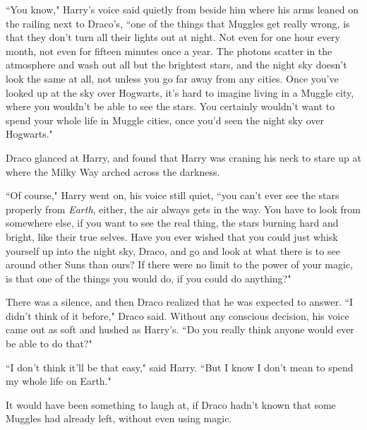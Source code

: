 ``You know," Harry's voice said quietly from beside him where his arms leaned on the railing next to Draco's, ``one of the things that Muggles get really wrong, is that they don't turn all their lights out at night. Not even for one hour every month, not even for fifteen minutes once a year. The photons scatter in the atmosphere and wash out all but the brightest stars, and the night sky doesn't look the same at all, not unless you go far away from any cities. Once you've looked up at the sky over Hogwarts, it's hard to imagine living in a Muggle city, where you wouldn't be able to see the stars. You certainly wouldn't want to spend your whole life in Muggle cities, once you'd seen the night sky over Hogwarts."

Draco glanced at Harry, and found that Harry was craning his neck to stare up at where the Milky Way arched across the darkness.

``Of course," Harry went on, his voice still quiet, ``you can't ever see the stars properly from \emph{Earth}, either, the air always gets in the way. You have to look from somewhere else, if you want to see the real thing, the stars burning hard and bright, like their true selves. Have you ever wished that you could just whisk yourself up into the night sky, Draco, and go and look at what there is to see around other Suns than ours? If there were no limit to the power of your magic, is that one of the things you would do, if you could do anything?"

There was a silence, and then Draco realized that he was expected to answer. ``I didn't think of it before," Draco said. Without any conscious decision, his voice came out as soft and hushed as Harry's. ``Do you really think anyone would ever be able to do that?"

``I don't think it'll be that easy," said Harry. ``But I know I don't mean to spend my whole life on Earth."

It would have been something to laugh at, if Draco hadn't known that some Muggles had already left, without even using magic.

